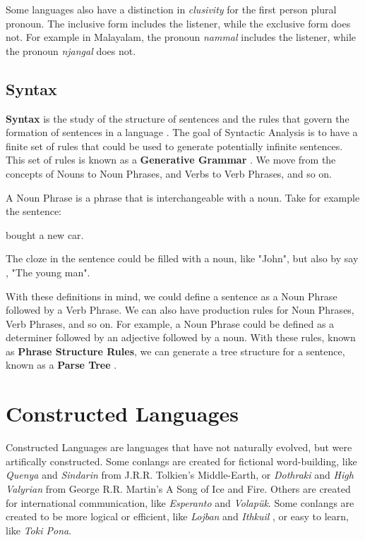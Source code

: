 Some languages also have a distinction in \textit{clusivity} for the first person plural pronoun. The inclusive form includes the listener, while the exclusive form does not.
For example in Malayalam, the pronoun \textit{nammal} includes the listener, while the pronoun \textit{njangal} does not.

\subsection{Syntax}
\textbf{Syntax} is the study of the structure of sentences and the rules that govern the formation of sentences in a language \cite{trask2007language}.
The goal of Syntactic Analysis is to have a finite set of rules that could be used to generate potentially infinite sentences. This set of rules is known as 
a \textbf{Generative Grammar} \cite{yule2020StudyLanguage}. We move from the concepts of Nouns to Noun Phrases, and Verbs to Verb Phrases, and so on.

A Noun Phrase is a phrase that is interchangeable with a noun. Take for example the sentence:

\begin{center}
    \underline{\hspace{2cm}} bought a new car.
\end{center}

The cloze in the sentence could be filled with a noun, like "John", but also by say , "The young man".

With these definitions in mind, we could define a sentence as a Noun Phrase followed by a Verb Phrase. We can also have production rules for 
Noun Phrases, Verb Phrases, and so on. For example, a Noun Phrase could be defined as a determiner followed by an adjective followed by a noun.
With these rules, known as \textbf{Phrase Structure Rules}, we can generate a tree structure for a sentence, known as a \textbf{Parse Tree} \cite{jm3}.




\section{Constructed Languages}
Constructed Languages are languages that have not naturally evolved, but were artifically constructed. Some conlangs are created for fictional word-building,
like \textit{Quenya} and \textit{Sindarin} from J.R.R. Tolkien's Middle-Earth, or \textit{Dothraki} and \textit{High Valyrian} from George R.R. Martin's A Song of Ice and Fire.
Others are created for international communication, like \textit{Esperanto} and \textit{Volapük}. Some conlangs are created to be more logical or efficient, like \textit{Lojban} and \textit{Ithkuil}
, or easy to learn, like \textit{Toki Pona}.

